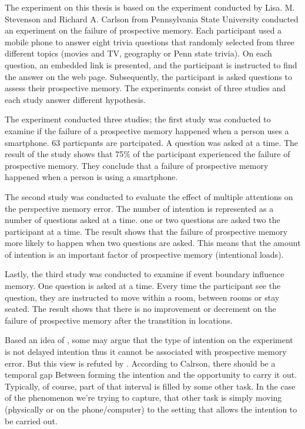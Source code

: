 The experiment on this thesis is based on the experiment conducted by Lisa. M. Stevenson and Richard A. Carlson from Pennsylvania State University conducted an
experiment on the failure of prospective memory.
Each participant used a mobile phone to answer eight trivia questions that randomly selected from three different topics (movies and TV, geography or Penn state trivia). On each question,
an embedded link is presented, and the participant is instructed to find the answer on the web page. Subsequently, the participant is asked questions to assess their prospective memory. The experiments consist of three studies and each study
answer different hypothesis.

The experiment conducted three studies; the first study was conducted to examine if the failure of a prospective memory happened when a person uses a smartphone.
63 particpants are partcipated. A question was asked at a time.
The result of the study shows that 75\% of the participant experienced the failure of prospective memory.
They conclude that a failure of prospective memory happened when a person is using a smartphone.


The second study was conducted to evaluate the effect of multiple attentions on the perspective memory error.
 The number of intention is represented as a number of questions asked at a time.
 one or two questions are asked two the participant at a time.
 The result shows that the failure of prospective memory more likely to
happen when two questions are asked. This means that the amount of intention is an important factor of prospective memory (intentional loads).

Lastly, the third study was conducted to examine if event boundary influence memory. One question is asked at a time.
Every time the participant see the question, they are instructed to move within a room, between rooms or stay seated.
The result shows that there is no improvement or decrement on the failure of prospective memory after the transtition in locations.

Based an idea of \cite{inside1996prospective}, some may argue that the type of intention on the experiment is not delayed intention
thus it cannot be associated with prospective memory error. But this view is
refuted by \cite{10.1371/journal.pone.0074447}. According to Calrson, there should be a temporal gap
Between forming the intention and the opportunity to carry it out. Typically, of course, part of that interval is filled by some other task.
In the case of the phenomenon we’re trying to capture, that other task is simply moving (physically or on the phone/computer) to the setting that allows the intention to be carried out.
